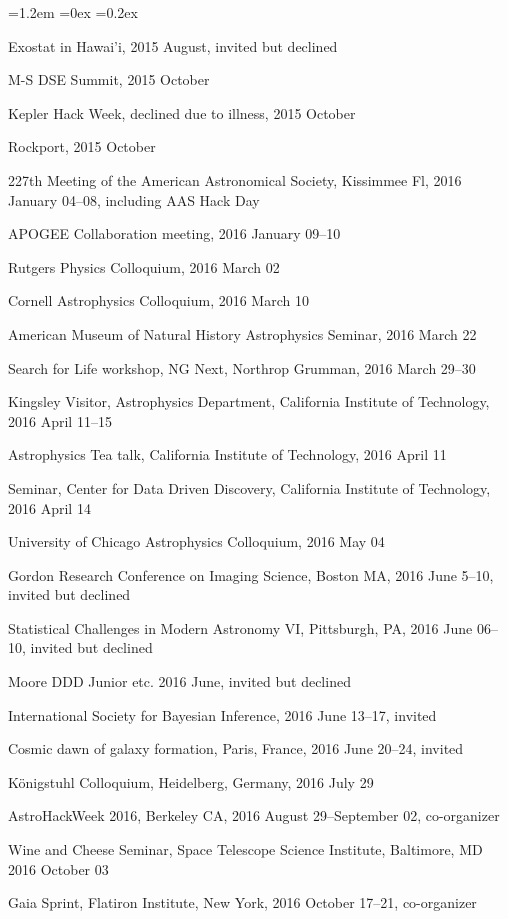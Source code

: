 \documentclass[10pt,letterpaper]{article}
\newcounter{refpubnum}
\newcommand{\hogglist}{%
    \rightmargin=0in
    \leftmargin=1.2em
    \topsep=0ex
    \partopsep=0pt
    \itemsep=0.2ex
    \parsep=0pt
    \itemindent=-1.0\leftmargin
    \listparindent=0.0\leftmargin
    \settowidth{\labelsep}{~}
    \usecounter{refpubnum}
  }
\begin{document}
\begin{list}{}{\hogglist}
{\item Exostat in Hawai'i, 2015 August, invited but declined
\item M-S DSE Summit, 2015 October
\item Kepler Hack Week, declined due to illness, 2015 October
\item Rockport, 2015 October
\item 227th Meeting of the American Astronomical Society, Kissimmee Fl, 2016 January 04--08, including AAS Hack Day
\item APOGEE Collaboration meeting, 2016 January 09--10
\item Rutgers Physics Colloquium, 2016 March 02
\item Cornell Astrophysics Colloquium, 2016 March 10
\item American Museum of Natural History Astrophysics Seminar, 2016 March 22
\item Search for Life workshop, NG Next, Northrop Grumman, 2016 March 29--30
\item Kingsley Visitor, Astrophysics Department, California Institute of Technology, 2016 April 11--15
\item Astrophysics Tea talk, California Institute of Technology, 2016 April 11
\item Seminar, Center for Data Driven Discovery, California Institute of Technology, 2016 April 14
\item University of Chicago Astrophysics Colloquium, 2016 May 04
\item Gordon Research Conference on Imaging Science, Boston MA, 2016 June 5--10, invited but declined
\item Statistical Challenges in Modern Astronomy VI, Pittsburgh, PA, 2016 June 06--10, invited but declined
\item Moore DDD Junior etc. 2016 June, invited but declined
\item International Society for Bayesian Inference, 2016 June 13--17, invited
\item Cosmic dawn of galaxy formation, Paris, France, 2016 June 20--24, invited
\item K\"onigstuhl Colloquium, Heidelberg, Germany, 2016 July 29
\item AstroHackWeek 2016, Berkeley CA, 2016 August 29--September 02, co-organizer
\item Wine and Cheese Seminar, Space Telescope Science Institute, Baltimore, MD 2016 October 03
\item Gaia Sprint, Flatiron Institute, New York, 2016 October 17--21, co-organizer
}
\end{list}
\end{document}
